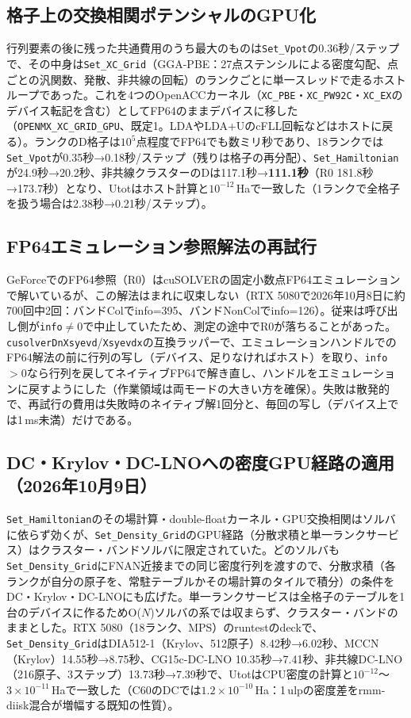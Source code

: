 \documentclass[a4paper,11pt]{ltjsarticle}
\newcommand{\code}[1]{\texttt{#1}}
\begin{document}
\subsection{格子上の交換相関ポテンシャルのGPU化}
行列要素の後に残った共通費用のうち最大のものは\code{Set\_Vpot}の0.36秒/ステップで、その中身は\code{Set\_XC\_Grid}（GGA-PBE：27点ステンシルによる密度勾配、点ごとの汎関数、発散、非共線の回転）のランクごとに単一スレッドで走るホストループであった。これを4つのOpenACCカーネル（\code{XC\_PBE}・\code{XC\_PW92C}・\code{XC\_EX}のデバイス転記を含む）としてFP64のままデバイスに移した（\code{OPENMX\_XC\_GRID\_GPU}、既定1。LDAやLDA+UのcFLL回転などはホストに戻る）。ランクのD格子は$10^5$点程度でFP64でも数ミリ秒であり、18ランクでは\code{Set\_Vpot}が0.35秒→0.18秒/ステップ（残りは格子の再分配）、\code{Set\_Hamiltonian}が24.9秒→20.2秒、非共線クラスターのDは117.1秒→\textbf{111.1秒}（R0 181.8秒→173.7秒）となり、Utotはホスト計算と$10^{-12}$\,Haで一致した（1ランクで全格子を扱う場合は2.38秒→0.21秒/ステップ）。

\subsection{FP64エミュレーション参照解法の再試行}
GeForceでのFP64参照（R0）はcuSOLVERの固定小数点FP64エミュレーションで解いているが、この解法はまれに収束しない（RTX 5080で2026年10月8日に約700回中2回：バンドColでinfo=395、バンドNonColでinfo=126）。従来は呼び出し側が\code{info}$\ne0$で中止していたため、測定の途中でR0が落ちることがあった。\code{cusolverDnXsyevd}/\code{Xsyevdx}の互換ラッパーで、エミュレーションハンドルでのFP64解法の前に行列の写し（デバイス、足りなければホスト）を取り、\code{info}$>0$なら行列を戻してネイティブFP64で解き直し、ハンドルをエミュレーションに戻すようにした（作業領域は両モードの大きい方を確保）。失敗は散発的で、再試行の費用は失敗時のネイティブ解1回分と、毎回の写し（デバイス上では1\,ms未満）だけである。

\subsection{DC・Krylov・DC-LNOへの密度GPU経路の適用（2026年10月9日）}
\code{Set\_Hamiltonian}のその場計算・double-floatカーネル・GPU交換相関はソルバに依らず効くが、\code{Set\_Density\_Grid}のGPU経路（分散求積と単一ランクサービス）はクラスター・バンドソルバに限定されていた。どのソルバも\code{Set\_Density\_Grid}にFNAN近接までの同じ密度行列を渡すので、分散求積（各ランクが自分の原子を、常駐テーブルかその場計算のタイルで積分）の条件をDC・Krylov・DC-LNOにも広げた。単一ランクサービスは全格子のテーブルを1台のデバイスに作るためO($N$)ソルバの系では収まらず、クラスター・バンドのままとした。RTX 5080（18ランク、MPS）のruntestのdeckで、\code{Set\_Density\_Grid}はDIA512-1（Krylov、512原子）8.42秒→6.02秒、MCCN（Krylov）14.55秒→8.75秒、CG15c-DC-LNO 10.35秒→7.41秒、非共線DC-LNO（216原子、3ステップ）13.73秒→7.39秒で、UtotはCPU密度の計算と$10^{-12}$〜$3\times10^{-11}$\,Haで一致した（C60のDCでは$1.2\times10^{-10}$\,Ha：1\,ulpの密度差をrmm-diisk混合が増幅する既知の性質）。
\end{document}
